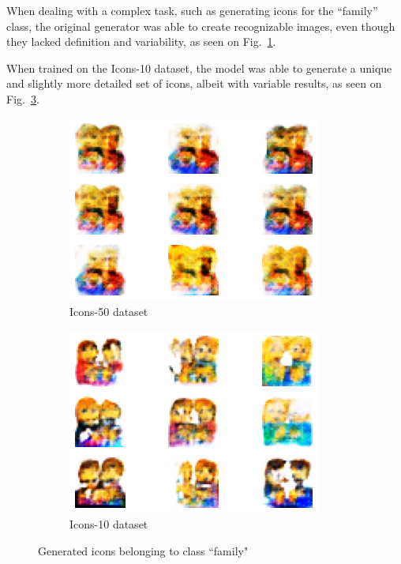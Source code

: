 When dealing with a complex task, such as generating icons for the ``family'' class, the original generator was able to create recognizable images, even though they lacked definition and variability, as seen on Fig.~\ref{fig:Icons50Family}.

When trained on the Icons-10 dataset, the model was able to generate a unique and slightly more detailed set of icons, albeit with variable results, as seen on Fig.~\ref{fig:Icons10Family}.

\begin{figure}[htbp]
    \begin{subfigure}[h]{0.4\linewidth}
        \includegraphics[width=\linewidth]{images/gen_icons/icons50_family}
        \caption{Icons-50 dataset}
        \label{fig:Icons50Family}
    \end{subfigure}
    \hfill
    \begin{subfigure}[h]{0.4\linewidth}
        \includegraphics[width=\linewidth]{images/gen_icons/icons10_family}
        \caption{Icons-10 dataset}
        \label{fig:Icons10Family}
    \end{subfigure}
    \caption{Generated icons belonging to class ``family"}
\end{figure}
